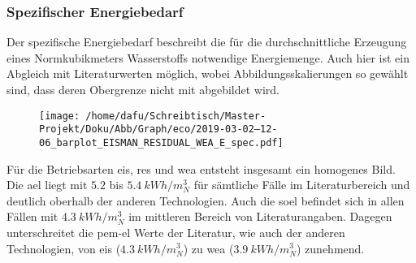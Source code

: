 \documentclass[onecolumn,10pt,titlepage]{article}
\begin{document}
%
%



\subsubsection{Spezifischer Energiebedarf}
Der spezifische Energiebedarf beschreibt die für die durchschnittliche Erzeugung eines Normkubikmeters Wasserstoffs notwendige Energiemenge. Auch hier ist ein Abgleich mit Literaturwerten möglich, wobei Abbildungsskalierungen so gewählt sind, dass deren Obergrenze nicht mit abgebildet wird.\\
\begin{figure}[H]
	
	\centering
	\texttt{[image: /home/dafu/Schreibtisch/Master-Projekt/Doku/Abb/Graph/eco/2019-03-02--12-06\_barplot\_EISMAN\_RESIDUAL\_WEA\_E\_spec.pdf]}
	\caption{ }
	\label{fig:analy_nC_Espec} 
\end{figure}
Für die Betriebsarten \gls{eis}, \gls{res} und \gls{wea} entsteht insgesamt ein homogenes Bild. Die \gls{ael} liegt mit $5.2$ bis $5.4~kWh/m^3_N$ für sämtliche Fälle im Literaturbereich und deutlich oberhalb der anderen Technologien. Auch die \gls{soel} befindet sich in allen Fällen mit $4.3~kWh/m^3_N$ im mittleren Bereich von Literaturangaben. Dagegen unterschreitet die \gls{pem}-\gls{el} Werte der Literatur, wie auch der anderen Technologien, von \gls{eis} ($4.3~kWh/m^3_N$) zu \gls{wea} ($3.9~kWh/m^3_N$) zunehmend.  
\end{document}
